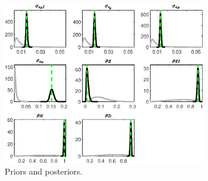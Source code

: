  
\begin{figure}[H]
\centering
\includegraphics[width=0.80\textwidth]{BRS_growth/Output/BRS_growth_PriorsAndPosteriors1}
\caption{Priors and posteriors.}\label{Fig:PriorsAndPosteriors:1}
\end{figure}
 
